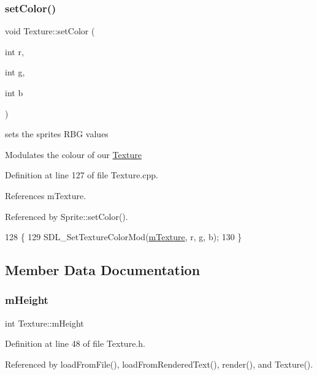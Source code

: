 \subsubsection{\texorpdfstring{set\+Color()}{setColor()}}
{\footnotesize\ttfamily void Texture\+::set\+Color (\begin{DoxyParamCaption}\item[{int}]{r,  }\item[{int}]{g,  }\item[{int}]{b }\end{DoxyParamCaption})}



sets the sprites R\+BG values 

Modulates the colour of our \hyperlink{class_texture}{Texture} 

Definition at line 127 of file Texture.\+cpp.



References m\+Texture.



Referenced by Sprite\+::set\+Color().


\begin{DoxyCode}
128 \{
129     SDL\_SetTextureColorMod(\hyperlink{class_texture_a28e61626f21dd1c69968e53687a13424}{mTexture}, r, g, b);
130 \}
\end{DoxyCode}


\subsection{Member Data Documentation}
\mbox{\label{class_texture_ad7078e03c0ef6e69b733eb85fd72aec2}} 
\subsubsection{\texorpdfstring{m\+Height}{mHeight}}
{\footnotesize\ttfamily int Texture\+::m\+Height\hspace{0.3cm}{\ttfamily [private]}}



Definition at line 48 of file Texture.\+h.



Referenced by load\+From\+File(), load\+From\+Rendered\+Text(), render(), and Texture().

\mbox{\label{class_texture_a28e61626f21dd1c69968e53687a13424}} 
